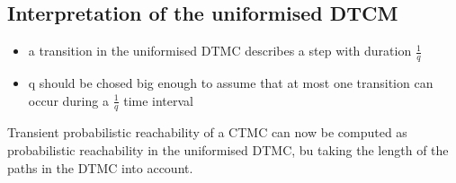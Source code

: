 \subsection{Interpretation of the uniformised DTCM}

\begin{itemize}
    \item a transition in the uniformised DTMC describes a step with duration $\frac{1}{q}$
    \item q should be chosed big enough to assume that at most one transition can occur during a $\frac{1}{q}$ time interval
\end{itemize}

Transient probabilistic reachability of a CTMC can now be computed as probabilistic reachability in the uniformised DTMC, bu taking the length of the paths in the DTMC into account.